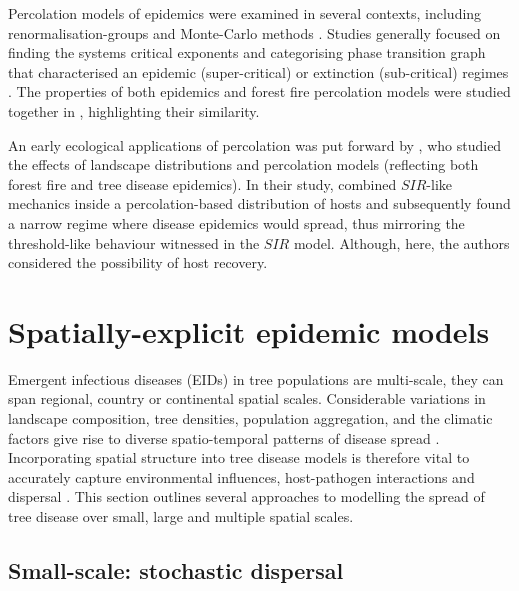 Percolation models of epidemics were examined in several contexts,
including renormalisation-groups \cite{pub.1060474189} and Monte-Carlo methods \cite{pub.1059069981}. 
Studies generally focused on finding the systems critical exponents and categorising phase
transition graph that characterised an epidemic (super-critical) or extinction (sub-critical) 
regimes \cite{GRASSBERGER1986273}. The properties of both epidemics and forest fire percolation 
models were studied together in \cite{pub.1052857560}, highlighting their similarity.

An early ecological applications of percolation was put forward by \cite{pub.1031591030}, 
who studied the effects of landscape distributions and percolation models 
(reflecting both forest fire and tree disease epidemics). In their study, \cite{pub.1031591030} 
combined $SIR$-like mechanics inside a percolation-based distribution of hosts and subsequently 
found a narrow regime where disease epidemics would spread, thus mirroring the threshold-like 
behaviour witnessed in the $SIR$ model. Although, here, the authors considered the possibility of host recovery.
\newpage

\section{Spatially-explicit epidemic models}
\label{ch2:lit-rev-compartmentalised-models}

Emergent infectious diseases (EIDs) in tree populations are multi-scale,
they can span regional, country or continental spatial scales. Considerable variations in landscape composition,
tree densities, population aggregation, and the climatic factors give rise to diverse spatio-temporal
patterns of disease spread \cite{he2019integrating, suzuki2003spatial}. Incorporating spatial structure
into tree disease models is therefore vital to accurately capture environmental influences, host-pathogen 
interactions and dispersal \cite{liu2007characterizing}. This section outlines several approaches to modelling
the spread of tree disease over small, large and multiple spatial scales.

\subsection{Small-scale: stochastic dispersal}
\label{ch2:dispersal}

